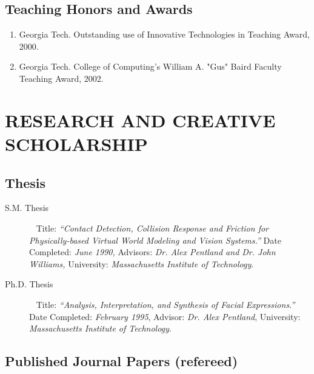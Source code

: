 \subsection{Teaching Honors and Awards}

\begin{enumerate}

\item Georgia Tech. Outstanding use of Innovative Technologies in
Teaching Award, 2000.
\item Georgia Tech. College of Computing's William A. "Gus" Baird Faculty Teaching Award, 2002.

\end{enumerate}

\newpage
\section{RESEARCH AND CREATIVE SCHOLARSHIP}
\label{sec:research}

\subsection{Thesis}
\label{subsec:thesisch}

\begin{description}

\item[S.M. Thesis]{~
\newline Title: {\sl ``Contact Detection, Collision Response and
Friction for Physically-based Virtual World Modeling and Vision
Systems.''}
\newline Date Completed: {\sl June 1990,}
\newline Advisors: {\sl Dr. Alex Pentland and Dr. John Williams,}
\newline University: {\sl Massachusetts Institute of
Technology}. }

\item[Ph.D. Thesis]{~
\newline Title: {\sl ``Analysis, Interpretation, and Synthesis of
Facial Expressions.''}
\newline Date Completed: {\sl February 1995},
\newline Advisor: {\sl Dr. Alex Pentland},
\newline University: {\sl Massachusetts Institute of
Technology}. }

\end{description}

\subsection{Published Journal Papers (refereed)}
\label{subsec:journals}

